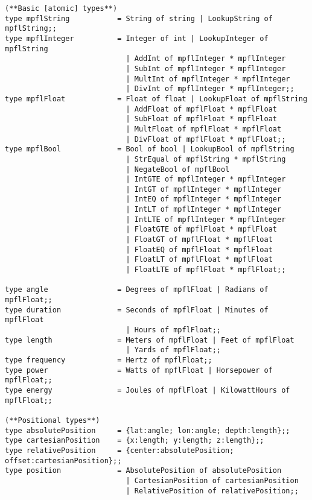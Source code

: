 \begin{verbatim}
(**Basic [atomic] types**)
type mpflString           = String of string | LookupString of mpflString;;
type mpflInteger          = Integer of int | LookupInteger of mpflString 
                            | AddInt of mpflInteger * mpflInteger 
                            | SubInt of mpflInteger * mpflInteger 
                            | MultInt of mpflInteger * mpflInteger
                            | DivInt of mpflInteger * mpflInteger;;
type mpflFloat            = Float of float | LookupFloat of mpflString 
                            | AddFloat of mpflFloat * mpflFloat 
                            | SubFloat of mpflFloat * mpflFloat
                            | MultFloat of mpflFloat * mpflFloat 
                            | DivFloat of mpflFloat * mpflFloat;;
type mpflBool             = Bool of bool | LookupBool of mpflString 
                            | StrEqual of mpflString * mpflString 
                            | NegateBool of mpflBool 
                            | IntGTE of mpflInteger * mpflInteger 
                            | IntGT of mpflInteger * mpflInteger 
                            | IntEQ of mpflInteger * mpflInteger 
                            | IntLT of mpflInteger * mpflInteger 
                            | IntLTE of mpflInteger * mpflInteger
                            | FloatGTE of mpflFloat * mpflFloat 
                            | FloatGT of mpflFloat * mpflFloat 
                            | FloatEQ of mpflFloat * mpflFloat 
                            | FloatLT of mpflFloat * mpflFloat 
                            | FloatLTE of mpflFloat * mpflFloat;;                             
                                                        
type angle                = Degrees of mpflFloat | Radians of mpflFloat;;
type duration             = Seconds of mpflFloat | Minutes of mpflFloat 
                            | Hours of mpflFloat;;
type length               = Meters of mpflFloat | Feet of mpflFloat 
                            | Yards of mpflFloat;;
type frequency            = Hertz of mpflFloat;;
type power                = Watts of mpflFloat | Horsepower of mpflFloat;;
type energy               = Joules of mpflFloat | KilowattHours of mpflFloat;;
 
(**Positional types**)
type absolutePosition     = {lat:angle; lon:angle; depth:length};;
type cartesianPosition    = {x:length; y:length; z:length};;
type relativePosition     = {center:absolutePosition; offset:cartesianPosition};;
type position             = AbsolutePosition of absolutePosition 
                            | CartesianPosition of cartesianPosition 
                            | RelativePosition of relativePosition;;


\end{verbatim}
